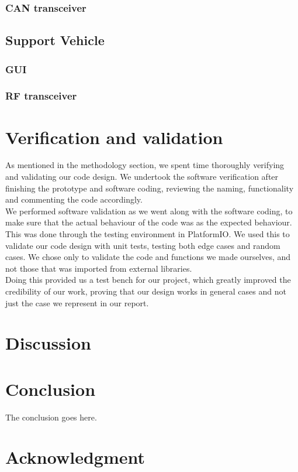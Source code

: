 \documentclass[conference]{IEEEtran}
\begin{document}
\subsubsection{CAN transceiver}
\subsection{Support Vehicle}
\subsubsection{GUI} %
\subsubsection{RF transceiver}

\section{Verification and validation} %
As mentioned in the methodology section, we spent time thoroughly verifying and validating our code design. We undertook the software verification after finishing the prototype and software coding, reviewing the naming, functionality and commenting the code accordingly.\\
We performed software validation as we went along with the software coding, to make sure that the actual behaviour of the code was as the expected behaviour. This was done through the testing environment in PlatformIO. We used this to validate our code design with unit tests, testing both edge cases and random cases. We chose only to validate the code and functions we made ourselves, and not those that was imported from external libraries.\\
Doing this provided us a test bench for our project, which greatly improved the credibility of our work, proving that our design works in general cases and not just the case we represent in our report.

\section{Discussion}

\section{Conclusion}
The conclusion goes here.


\section*{Acknowledgment}
\end{document}

